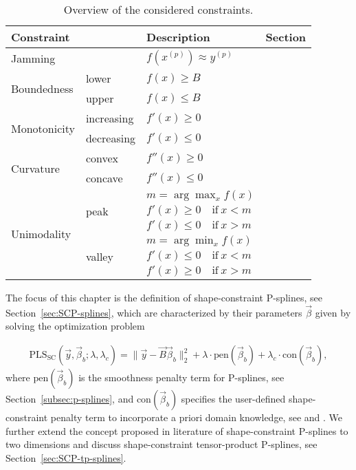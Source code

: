 \begin{table}[H]
	\centering
	\begin{tabular}{|l|ll|l|}
		\hline
		\textbf{Constraint}& & \textbf{Description}   & \textbf{Section}     \\ \hline \toprule
		Jamming            & & $f(x^{(p)}) \approx y^{(p)}$ & \pref{subsec:JammC} \\ \hline 
		\multirow{2}{*}{Boundedness}  & lower & $f(x)\ge B$ 	  &	\pref{subsec:BoudC} \\ \cline{2-4}
		& upper & $f(x)\le B$    & \pref{subsec:BoudC} \\ \hline
		\multirow{2}{*}{Monotonicity} & increasing & $f'(x) \ge 0$ 	& \pref{subsec:MIC} \\ \cline{2-4}
		& decreasing & $f'(x) \le 0$  & \pref{subsec:MDC} \\ \hline	
		\multirow{2}{*}{Curvature}    & convex     & $f''(x)\ge 0$ 	& \pref{subsec:ConvC} \\ \cline{2-4}
		& concave    & $f''(x)\le 0$ 	& \pref{subsec:ConcC} \\ \hline
		\multirow{6}{*}{Unimodality}  & \multirow[t]{3}{*}{peak}  & $m = \arg \max_{x} f(x)$  & \pref{subsec:PeakC} \\ 
		&	                       & $f'(x) \ge 0 \quad \text{if} \ x < m$ & \\ 
		&  				       & $f'(x) \le 0 \quad \text{if} \ x > m$ & \\ \cline{2-4} 
		& \multirow[t]{3}{*}{valley}& $m = \arg \min_{x} f(x)$  & \pref{subsec:ValleyC} \\ 
		&	                       & $f'(x) \le 0 \quad \text{if} \ x < m$ & \\ 
		&  				       & $f'(x) \ge 0 \quad \text{if} \ x > m$ &  \\ \hline		\bottomrule
	\end{tabular}
	\caption{Overview of the considered constraints.}
	\label{tab:constraint_overview}
\end{table}
%
The focus of this chapter is the definition of shape-constraint P-splines, see Section~\ref{sec:SCP-splines}, which are characterized by their parameters $\vec{\beta}$ given by solving the optimization problem

\begin{align} \label{eq:OF-SCP-splines}
	\text{PLS}_{\text{SC}} (\vec{y}, \vec{\beta}_b; \lambda, \lambda_c) = \lVert \vec{y} - \vec{B} \vec{\beta}_b \rVert_2^2 + \lambda \cdot \text{pen}(\vec{\beta}_b) + \lambda_c \cdot \text{con}(\vec{\beta}_b),
\end{align}
%
where $\text{pen}(\vec{\beta}_b)$ is the smoothness penalty term for P-splines, see Section~\ref{subsec:p-splines}, and $\text{con}(\vec{\beta}_b)$ specifies the user-defined shape-constraint penalty term to incorporate a priori domain knowledge, see \cite{hofner2011monotonicity} and \cite{bollaerts2006simple}. We further extend the concept proposed in literature of shape-constraint P-splines to two dimensions and discuss shape-constraint tensor-product P-splines, see Section~\ref{sec:SCP-tp-splines}.

